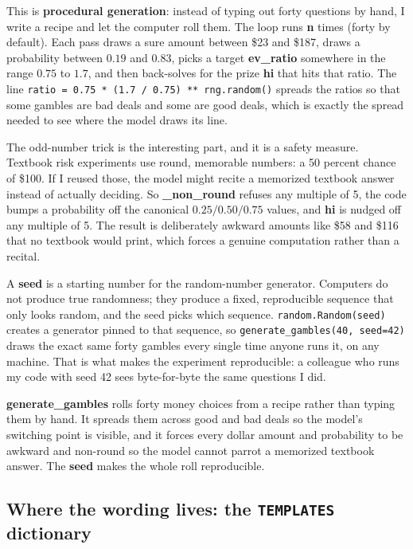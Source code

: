 \documentclass[11pt]{article}
\newcommand{\term}[1]{\textbf{\color{mossdk}#1}}
\newcommand{\file}[1]{\textbf{\ttfamily #1}}
\begin{document}
This is \term{procedural generation}: instead of typing out forty questions by hand, I write a recipe
and let the computer roll them. The loop runs \file{n} times (forty by default). Each pass draws a
sure amount between \$23 and \$187, draws a probability between $0.19$ and $0.83$, picks a target
\file{ev\_ratio} somewhere in the range $0.75$ to $1.7$, and then back-solves for the prize \file{hi}
that hits that ratio. The line \verb|ratio = 0.75 * (1.7 / 0.75) ** rng.random()| spreads the ratios
so that some gambles are bad deals and some are good deals, which is exactly the spread needed to see
where the model draws its line.

The odd-number trick is the interesting part, and it is a safety measure. Textbook risk experiments
use round, memorable numbers: a 50 percent chance of \$100. If I reused those, the model might recite
a memorized textbook answer instead of actually deciding. So \file{\_non\_round} refuses any multiple
of 5, the code bumps a probability off the canonical $0.25/0.50/0.75$ values, and \file{hi} is
nudged off any multiple of 5. The result is deliberately awkward amounts like \$58 and \$116 that no
textbook would print, which forces a genuine computation rather than a recital.

\begin{defbox}[Seed]
A \term{seed} is a starting number for the random-number generator. Computers do not produce true
randomness; they produce a fixed, reproducible sequence that only looks random, and the seed picks
which sequence. \verb|random.Random(seed)| creates a generator pinned to that sequence, so
\verb|generate_gambles(40, seed=42)| draws the exact same forty gambles every single time anyone runs
it, on any machine. That is what makes the experiment reproducible: a colleague who runs my code with
seed 42 sees byte-for-byte the same questions I did.
\end{defbox}

\begin{plainbox}
\file{generate\_gambles} rolls forty money choices from a recipe rather than typing them by hand. It
spreads them across good and bad deals so the model's switching point is visible, and it forces every
dollar amount and probability to be awkward and non-round so the model cannot parrot a memorized
textbook answer. The \file{seed} makes the whole roll reproducible.
\end{plainbox}

\subsection{Where the wording lives: the \texttt{TEMPLATES} dictionary}
\end{document}
